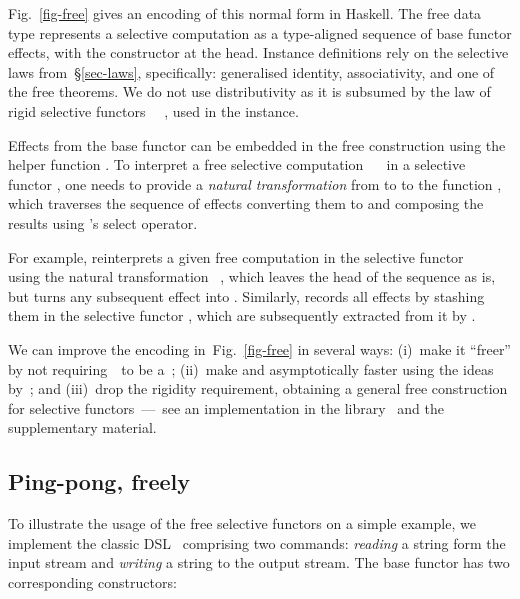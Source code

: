 Fig.~\ref{fig-free} gives an encoding of this normal form in Haskell. The free
data type  represents a selective computation as a type-aligned
sequence of base functor effects, with the  constructor at the head.
Instance definitions rely on the selective laws from~\S\ref{sec-laws},
specifically: generalised identity, associativity, and one of the free theorems.
We do not use distributivity as it is subsumed by the law of rigid selective
functors \hs{(<*>)}~\hs{=}~, used in the  instance.

Effects from the base functor can be embedded in the free construction using
the helper function . To interpret a free selective computation
~~ in a selective functor , one needs to provide
a \emph{natural transformation} from  to  to the function
, which traverses the sequence of effects converting them to
 and composing the results using 's select operator.

For example,  reinterprets a given free computation in the selective
functor ~\hs{=}~ using the natural transformation
~, which leaves the  head of the sequence as is,
but turns any subsequent effect into . Similarly, 
records all effects by stashing them in the selective functor , which
are subsequently extracted from it by .

We can improve the encoding in~Fig.~\ref{fig-free} in several ways: (i)~make it
``freer'' by not requiring~~to be a~; (ii)~make  and
 asymptotically faster using the ideas
by~\citet{menendez2013free}; and (iii)~drop the rigidity requirement,
obtaining a general free construction for selective functors~---~see an
implementation in the library~\citep{selective2019haskell} and the supplementary
material.

\subsection{Ping-pong, freely}\label{sec-free-ping-pong}

To illustrate the usage of the free selective functors on a simple example,
we implement the classic  DSL~\cite{swierstra2008data} comprising
two commands: \emph{reading} a string form the input stream and \emph{writing}
a string to the output stream. The base functor has two corresponding
constructors:

